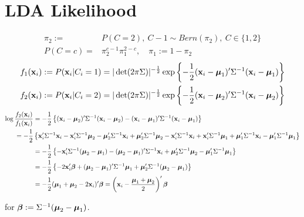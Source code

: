 \documentclass[11pt]{article}
\newcommand{\bbeta}     {\mbox{\boldmath{$\beta$}\unboldmath}}
\newcommand{\bmu}       {\mbox{\boldmath{$\mu$}\unboldmath}}
\newcommand{\bx}   {{\bf x}}
\begin{document}
	\section{LDA Likelihood}
	\begin{align*}
	\pi_2:=&P(C=2),~C-1\sim Bern(\pi_2),~C\in\{1,2\}\\
	P(C=c)=&\pi_2^{c-1}\pi_1^{2-c},\quad\pi_1:=1-\pi_2
	\end{align*}
	\begin{align*}
	f_1(\bx_i):=P(\bx_i|C_i=1)=|\det(2\pi\Sigma)|^{-\frac{1}{2}}\exp\left\{-\frac{1}{2}(\bx_i-\bmu_1)'\Sigma^{-1}(\bx_i-\bmu_1)\right\}\\
	f_2(\bx_i):=P(\bx_i|C_i=2)=|\det(2\pi\Sigma)|^{-\frac{1}{2}}\exp\left\{-\frac{1}{2}(\bx_i-\bmu_2)'\Sigma^{-1}(\bx_i-\bmu_2)\right\}
	\end{align*}
	\begin{align*}
	\log\frac{f_2(\bx_i)}{f_1(\bx_i)}&=-\frac{1}{2}\left\{
	(\bx_i-\bmu_2)'\Sigma^{-1}(\bx_i-\bmu_2)-(\bx_i-\bmu_1)'\Sigma^{-1}(\bx_i-\bmu_1)
	\right\}\\
	=-\frac{1}{2}&\left\{
	\bx_i'\Sigma^{-1}\bx_i-\bx_i'\Sigma^{-1}\bmu_2-\bmu_2'\Sigma^{-1}\bx_i+\bmu_2'\Sigma^{-1}\bmu_2-\bx_i'\Sigma^{-1}\bx_i+\bx_i'\Sigma^{-1}\bmu_1+\bmu_1'\Sigma^{-1}\bx_i-\bmu_1'\Sigma^{-1}\bmu_1
	\right\}\\
	&=-\frac{1}{2}\left\{-\bx_i'\Sigma^{-1}(\bmu_2-\bmu_1)-(\bmu_2-\bmu_1)'\Sigma^{-1}\bx_i+\bmu_2'\Sigma^{-1}\bmu_2-\bmu_1'\Sigma^{-1}\bmu_1\right\}\\
	&=-\frac{1}{2}\left\{-2\bx_i'\bbeta+(\bmu_2-\bmu_1)'\Sigma^{-1}\bmu_1+\bmu_2'\Sigma^{-1}(\bmu_2-\bmu_1)\right\}\\
	&=-\frac{1}{2}(\bmu_1+\bmu_2-2\bx_i)'\bbeta=\left(\bx_i-\frac{\bmu_1+\bmu_2}{2}\right)'\bbeta
	\end{align*}
	
	for $\bbeta:=\Sigma^{-1}(\bmu_2-\bmu_1)$.
	
\end{document}
